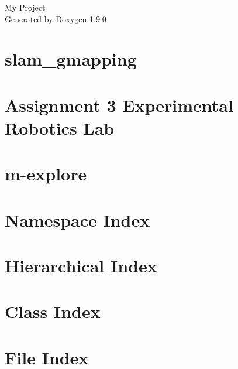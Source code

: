 \let\mypdfximage\pdfximage\def\pdfximage{\immediate\mypdfximage}\documentclass[twoside]{book}
\newcommand{\+}{\discretionary{\mbox{\scriptsize$\hookleftarrow$}}{}{}}
\newcommand{\clearemptydoublepage}{%
  \newpage{\pagestyle{empty}\cleardoublepage}%
}
\begin{document}
\raggedbottom

\hypersetup{pageanchor=false,
             bookmarksnumbered=true,
             pdfencoding=unicode
            }
\begin{titlepage}
\vspace*{7cm}
\begin{center}%
{\Large My Project }\\
\vspace*{1cm}
{\large Generated by Doxygen 1.9.0}\\
\end{center}
\end{titlepage}
\clearemptydoublepage
{}
\tableofcontents
\clearemptydoublepage
{}
\hypersetup{pageanchor=true}

\chapter{slam\+\_\+gmapping}
\label{index}\hypertarget{index}{}
\chapter{Assignment 3 Experimental Robotics Lab}
\label{md__r_e_a_d_m_e}

\chapter{m-\/explore}
\label{md_src_explore__r_e_a_d_m_e}

\chapter{Namespace Index}

\chapter{Hierarchical Index}

\chapter{Class Index}

\chapter{File Index}

\end{document}
